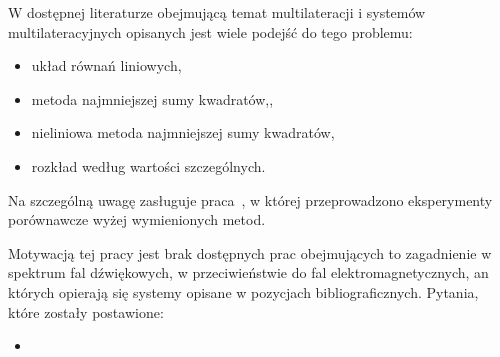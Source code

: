 W dostępnej literaturze obejmującą temat multilateracji i systemów multilateracyjnych opisanych jest wiele podejść do tego problemu:

\begin{itemize}
    \item układ równań liniowych\cite{murphy1995determination},
    \item metoda najmniejszej sumy kwadratów\cite{murphy1995determination},\cite{norrdine2012algebraic},
    \item nieliniowa metoda najmniejszej sumy kwadratów\cite{murphy1995determination},
    \item rozkład według wartości szczególnych\cite{murphy1995determination}.
\end{itemize}
Na szczególną uwagę zasługuje praca~\cite{murphy1995determination}, w której przeprowadzono eksperymenty porównawcze wyżej wymienionych metod.


Motywacją tej pracy jest brak dostępnych prac obejmujących to zagadnienie w spektrum fal dźwiękowych, w przeciwieństwie do fal elektromagnetycznych, an których opierają się systemy opisane w pozycjach bibliograficznych. Pytania, które zostały postawione:

\begin{itemize}
    \item 
\end{itemize}

